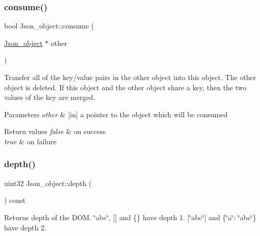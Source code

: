 \mbox{\label{classJson__object_a1446f0234194bec97b216d7eb42e790c}} 
\subsubsection{\texorpdfstring{consume()}{consume()}}
{\footnotesize\ttfamily bool Json\+\_\+object\+::consume (\begin{DoxyParamCaption}\item[{\mbox{\hyperlink{classJson__object}{Json\+\_\+object}} $\ast$}]{other }\end{DoxyParamCaption})}

Transfer all of the key/value pairs in the other object into this object. The other object is deleted. If this object and the other object share a key, then the two values of the key are merged.


\begin{DoxyParams}{Parameters}
{\em other} & \mbox{[}in\mbox{]} a pointer to the object which will be consumed \\
\hline
\end{DoxyParams}

\begin{DoxyRetVals}{Return values}
{\em false} & on success \\
\hline
{\em true} & on failure \\
\hline
\end{DoxyRetVals}
\mbox{\label{classJson__object_a639ad387120ba5bea5372896f6e30c38}} 
\subsubsection{\texorpdfstring{depth()}{depth()}}
{\footnotesize\ttfamily uint32 Json\+\_\+object\+::depth (\begin{DoxyParamCaption}{ }\end{DoxyParamCaption}) const\hspace{0.3cm}{\ttfamily [virtual]}}

\begin{DoxyReturn}{Returns}
depth of the D\+OM. \char`\"{}abc\char`\"{}, \mbox{[}\mbox{]} and \{\} have depth 1. \mbox{[}\char`\"{}abc\char`\"{}\mbox{]} and \{\char`\"{}a\char`\"{}\+: \char`\"{}abc\char`\"{}\} have depth 2. 
\end{DoxyReturn}


